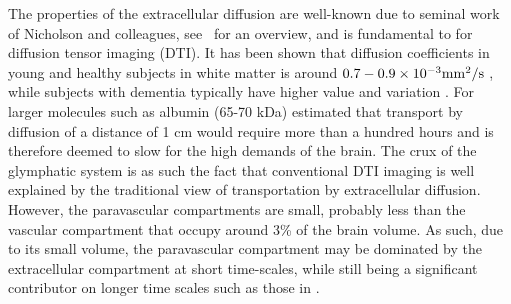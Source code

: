 \documentclass[12pt,a4paper]{article}
\begin{document}
The properties of the extracellular diffusion are well-known due to seminal work of Nicholson and colleagues, see~\cite{sykova2008diffusion} for an overview, and is fundamental to for  diffusion tensor imaging (DTI). 
It has been shown that diffusion coefficients in young and healthy subjects in white matter is around $0.7-0.9\times 10^{-3} \mathrm{mm\sp{2}/s}$ \citet{Helenius194},
while subjects with dementia typically have higher value and variation \cite{goujon2018can}. 
For larger molecules such as albumin (65-70 kDa) \citet{cserr1971physiology} estimated that transport by diffusion of a distance of 1 cm would require more than a hundred hours
and is therefore deemed to slow for the high demands of the brain.  
The crux of the glymphatic system is as such the fact that conventional DTI imaging is well explained by the traditional view of transportation by extracellular diffusion. 
However, the paravascular compartments are small, probably less than the vascular compartment that occupy around 3\% of the brain volume. As such, 
due to its small volume, the paravascular compartment may be dominated by the extracellular compartment at short time-scales, while still being a
significant contributor on longer time scales such as those in \cite{ringstad2018brain}. 

%
\end{document}
